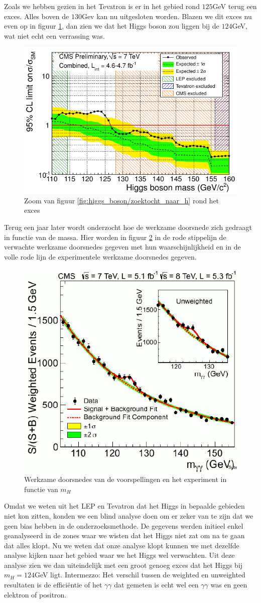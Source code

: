\documentclass[../main.tex]{subfiles}
\begin{document}
Zoals we hebben gezien in het Tevatron is er in het gebied rond $125$GeV terug een exces. Alles boven de $130$Gev kan nu uitgesloten worden. Blazen we dit exces nu even op in figuur \ref{fig:higgs_boson/zoektocht_h_zoom}, dan zien we dat het Higgs boson zou liggen bij de $124$GeV, wat niet echt een verrassing was.

\begin{figure}[h]
    \centering
    \includegraphics[width=0.6\linewidth]{higgs_boson/zoektocht_h_zoom.png}
    \caption{Zoom van figuur \ref{fig:higgs_boson/zoektocht_naar_h} rond het exces}%
    \label{fig:higgs_boson/zoektocht_h_zoom}
\end{figure}

Terug een jaar later wordt onderzocht hoe de werkzame doorsnede zich gedraagt in functie van de massa. Hier worden in figuur \ref{fig:higgs_boson/sigma_h_zoektocht} in de rode stippelijn de verwachte werkzame doorsnedes gegeven met hun waarschijnlijkheid en in de volle rode lijn de experimentele werkzame doorsnedes gegeven.

\begin{figure}[h]
    \centering
    \includegraphics[width=0.4\linewidth]{higgs_boson/sigma_h_zoektocht.png}
    \caption{Werkzame doorsnedes van de voorspellingen en het experiment in functie van $m_H$}%
    \label{fig:higgs_boson/sigma_h_zoektocht}
\end{figure}

Omdat we weten uit het LEP en Tevatron dat het Higgs in bepaalde gebieden niet kon zitten, konden we een blind analyse doen om er zeker van te zijn dat we geen bias hebben in de onderzoeksmethode. De gegevens werden initieel enkel geanalyseerd in de zones waar we wisten dat het Higgs niet zat om na te gaan dat alles klopt. Nu we weten dat onze analyse klopt kunnen we met dezelfde analyse kijken naar het gebied waar we het Higgs wel verwachten. Uit deze analyse zien we dan uiteindelijk met een groot genoeg exces dat het Higgs bij $m_H=124$GeV ligt. {\color{blue} Intermezzo: Het verschil tussen de weighted en unweighted resultaten is de efficiëntie of het $\gamma\gamma$ dat gemeten is echt wel een $\gamma\gamma$ was en geen elektron of positron.}
\end{document}
